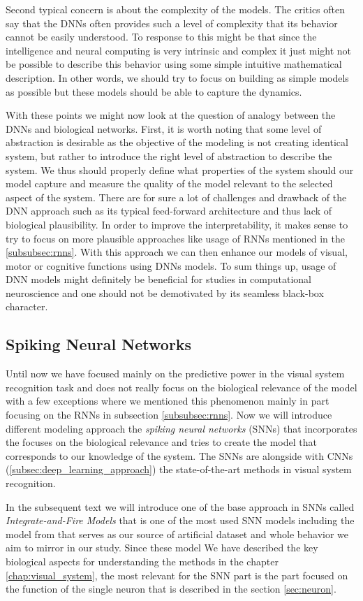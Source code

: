 Second typical concern is about the complexity of the models. The critics often say that the DNNs often provides such a level of complexity that its behavior cannot be easily understood. To response to this might be that since the intelligence and neural computing is very intrinsic and complex it just might not be possible to describe this behavior using some simple intuitive mathematical description. In other words, we should try to focus on building as simple models as possible but these models should be able to capture the dynamics.

With these points we might now look at the question of analogy between the DNNs and biological networks. First, it is worth noting that some level of abstraction is desirable as the objective of the modeling is not creating identical system, but rather to introduce the right level of abstraction to describe the system. We thus should properly define what properties of the system should our model capture and measure the quality of the model relevant to the selected aspect of the system. There are for sure a lot of challenges and drawback of the DNN approach such as its typical feed-forward architecture and thus lack of biological plausibility. In order to improve the interpretability, it makes sense to try to focus on more plausible approaches like usage of RNNs mentioned in the \ref{subsubsec:rnns}. With this approach we can then enhance our models of visual, motor or cognitive functions using DNNs models. To sum things up, usage of DNN models might definitely be beneficial for studies in computational neuroscience and one should not be demotivated by its seamless black-box character.

\subsection{Spiking Neural Networks}
\label{subsec:spiking_neural_nets}
Until now we have focused mainly on the predictive power in the visual system recognition task and does not really focus on the biological relevance of the model with a few exceptions where we mentioned this phenomenon mainly in part focusing on the RNNs in subsection \ref{subsubsec:rnns}. Now we will introduce different modeling approach the \emph{spiking neural networks} (SNNs) that incorporates the focuses on the biological relevance and tries to create the model that corresponds to our knowledge of the system. The SNNs are alongside with CNNs (\ref{subsec:deep_learning_approach}) the state-of-the-art methods in visual system recognition.

In the subsequent text we will introduce one of the base approach in SNNs called \emph{Integrate-and-Fire Models} that is one of the most used SNN models including the model from \citet{antolik2024comprehensive} that serves as our source of artificial dataset and whole behavior we aim to mirror in our study. Since these model We have described the key biological aspects for understanding the methods in the chapter \ref{chap:visual_system}, the most relevant for the SNN part is the part focused on the function of the single neuron that is described in the section \ref{sec:neuron}. 

